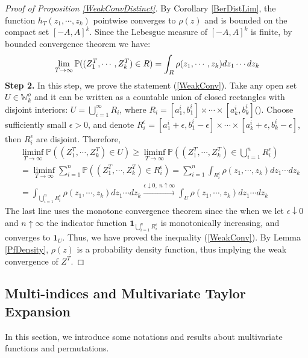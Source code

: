 \begin{proof}[Proof of Proposition \ref{WeakConvDistinct}]
By Corollary \ref{BerDistLim}, the function $h_{T}(z_{1},\cdots,z_{k})$ pointwise converges to $\rho(z)$ and is bounded on the compact set $[-A,A]^{k}$. Since the Lebesgue measure of $[-A,A]^{k}$ is finite, by bounded convergence theorem we have:
\begin{align}{\label{ConvOnRect}}
	\lim_{T\rightarrow\infty}\mathbb{P}((Z_{1}^{T},\cdots,Z_{k}^{T})\in R)=\int_{R}\rho(z_{1},\cdots,z_{k})dz_{1}\cdots dz_{k}
\end{align}
\textbf{Step 2. }In this step, we prove the statement (\ref{WeakConv}). Take any open set $U\in \mathbb{W}_{k}^{o}$ and it can be written as a countable union of closed rectangles with disjoint interiors: $U=\bigcup_{i=1}^{\infty}R_{i}$, where $R_{i}=[a_{1}^{i},b_{1}^{i}]\times\cdots\times[a_{k}^{i},b_{k}^{i}]$(\cite[Theorem 1.4]{Stein}). Choose sufficiently small $\epsilon>0$, and denote $R_{i}^{\epsilon}=[a_{1}^{i}+\epsilon,b_{1}^{i}-\epsilon]\times\cdots\times[a_{k}^{i}+\epsilon,b_{k}^{i}-\epsilon]$, then $R_{i}^{\epsilon}$ are disjoint. Therefore,
\begin{align*}
	&\liminf_{T\rightarrow\infty}\mathbb{P}((Z_{1}^{T},\cdots,Z_{k}^{T})\in U)\geq\liminf_{T\rightarrow\infty}\mathbb{P}((Z_{1}^{T},\cdots,Z_{k}^{T})\in \bigcup_{i=1}^{n}R_{i}^{\epsilon})\\
	&=\liminf_{T\rightarrow\infty}\sum_{i=1}^{n}\mathbb{P}((Z_{1}^{T},\cdots,Z_{k}^{T})\in R_{i}^{\epsilon})=\sum_{i=1}^{n}\int_{R_{i}^{\epsilon}}\rho(z_1,\cdots,z_{k})dz_{1}\cdots dz_{k}\\
	&=\int_{\bigcup_{i=1}^{n}R_{i}^{\epsilon}}\rho(z_1,\cdots,z_{k})dz_{1}\cdots dz_{k} \xrightarrow{\epsilon\downarrow 0,\ n\uparrow\infty} \int_{U}\rho(z_1,\cdots,z_{k})dz_{1}\cdots dz_{k}
\end{align*}
The last line uses the monotone convergence theorem since the when we let $\epsilon\downarrow 0$ and $n\uparrow\infty$ the indicator function $\mathbf{1}_{\bigcup_{i=1}^{n}R_{i}^{\epsilon}}$ is monotonically increasing, and converges to $\mathbf{1}_{U}$. Thus, we have proved the inequality (\ref{WeakConv}). By Lemma \ref{PfDensity}, $\rho(z)$ is a probability density function, thus implying the weak convergence of $Z^{T}$.
\end{proof}

\subsection{Multi-indices and Multivariate Taylor Expansion}\label{multivar} 
In this section, we introduce some notations and results about multivariate functions and permutations.

